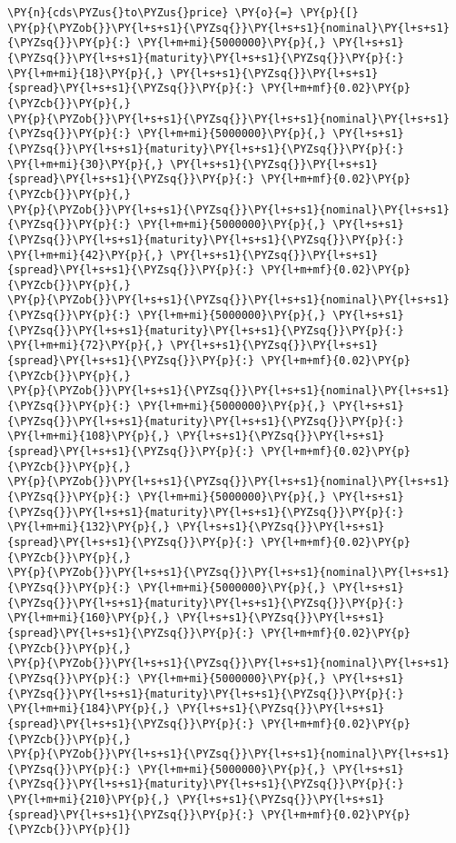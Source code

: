 \begin{Answer}
\begin{codebox}[size=fbox, boxrule=1pt,colback=cellbackground, colframe=cellborder]
\begin{Verbatim}[commandchars=\\\{\}]
\PY{n}{cds\PYZus{}to\PYZus{}price} \PY{o}{=} \PY{p}{[}
\PY{p}{\PYZob{}}\PY{l+s+s1}{\PYZsq{}}\PY{l+s+s1}{nominal}\PY{l+s+s1}{\PYZsq{}}\PY{p}{:} \PY{l+m+mi}{5000000}\PY{p}{,} \PY{l+s+s1}{\PYZsq{}}\PY{l+s+s1}{maturity}\PY{l+s+s1}{\PYZsq{}}\PY{p}{:} \PY{l+m+mi}{18}\PY{p}{,} \PY{l+s+s1}{\PYZsq{}}\PY{l+s+s1}{spread}\PY{l+s+s1}{\PYZsq{}}\PY{p}{:} \PY{l+m+mf}{0.02}\PY{p}{\PYZcb{}}\PY{p}{,}
\PY{p}{\PYZob{}}\PY{l+s+s1}{\PYZsq{}}\PY{l+s+s1}{nominal}\PY{l+s+s1}{\PYZsq{}}\PY{p}{:} \PY{l+m+mi}{5000000}\PY{p}{,} \PY{l+s+s1}{\PYZsq{}}\PY{l+s+s1}{maturity}\PY{l+s+s1}{\PYZsq{}}\PY{p}{:} \PY{l+m+mi}{30}\PY{p}{,} \PY{l+s+s1}{\PYZsq{}}\PY{l+s+s1}{spread}\PY{l+s+s1}{\PYZsq{}}\PY{p}{:} \PY{l+m+mf}{0.02}\PY{p}{\PYZcb{}}\PY{p}{,}
\PY{p}{\PYZob{}}\PY{l+s+s1}{\PYZsq{}}\PY{l+s+s1}{nominal}\PY{l+s+s1}{\PYZsq{}}\PY{p}{:} \PY{l+m+mi}{5000000}\PY{p}{,} \PY{l+s+s1}{\PYZsq{}}\PY{l+s+s1}{maturity}\PY{l+s+s1}{\PYZsq{}}\PY{p}{:} \PY{l+m+mi}{42}\PY{p}{,} \PY{l+s+s1}{\PYZsq{}}\PY{l+s+s1}{spread}\PY{l+s+s1}{\PYZsq{}}\PY{p}{:} \PY{l+m+mf}{0.02}\PY{p}{\PYZcb{}}\PY{p}{,}
\PY{p}{\PYZob{}}\PY{l+s+s1}{\PYZsq{}}\PY{l+s+s1}{nominal}\PY{l+s+s1}{\PYZsq{}}\PY{p}{:} \PY{l+m+mi}{5000000}\PY{p}{,} \PY{l+s+s1}{\PYZsq{}}\PY{l+s+s1}{maturity}\PY{l+s+s1}{\PYZsq{}}\PY{p}{:} \PY{l+m+mi}{72}\PY{p}{,} \PY{l+s+s1}{\PYZsq{}}\PY{l+s+s1}{spread}\PY{l+s+s1}{\PYZsq{}}\PY{p}{:} \PY{l+m+mf}{0.02}\PY{p}{\PYZcb{}}\PY{p}{,}
\PY{p}{\PYZob{}}\PY{l+s+s1}{\PYZsq{}}\PY{l+s+s1}{nominal}\PY{l+s+s1}{\PYZsq{}}\PY{p}{:} \PY{l+m+mi}{5000000}\PY{p}{,} \PY{l+s+s1}{\PYZsq{}}\PY{l+s+s1}{maturity}\PY{l+s+s1}{\PYZsq{}}\PY{p}{:} \PY{l+m+mi}{108}\PY{p}{,} \PY{l+s+s1}{\PYZsq{}}\PY{l+s+s1}{spread}\PY{l+s+s1}{\PYZsq{}}\PY{p}{:} \PY{l+m+mf}{0.02}\PY{p}{\PYZcb{}}\PY{p}{,}
\PY{p}{\PYZob{}}\PY{l+s+s1}{\PYZsq{}}\PY{l+s+s1}{nominal}\PY{l+s+s1}{\PYZsq{}}\PY{p}{:} \PY{l+m+mi}{5000000}\PY{p}{,} \PY{l+s+s1}{\PYZsq{}}\PY{l+s+s1}{maturity}\PY{l+s+s1}{\PYZsq{}}\PY{p}{:} \PY{l+m+mi}{132}\PY{p}{,} \PY{l+s+s1}{\PYZsq{}}\PY{l+s+s1}{spread}\PY{l+s+s1}{\PYZsq{}}\PY{p}{:} \PY{l+m+mf}{0.02}\PY{p}{\PYZcb{}}\PY{p}{,}
\PY{p}{\PYZob{}}\PY{l+s+s1}{\PYZsq{}}\PY{l+s+s1}{nominal}\PY{l+s+s1}{\PYZsq{}}\PY{p}{:} \PY{l+m+mi}{5000000}\PY{p}{,} \PY{l+s+s1}{\PYZsq{}}\PY{l+s+s1}{maturity}\PY{l+s+s1}{\PYZsq{}}\PY{p}{:} \PY{l+m+mi}{160}\PY{p}{,} \PY{l+s+s1}{\PYZsq{}}\PY{l+s+s1}{spread}\PY{l+s+s1}{\PYZsq{}}\PY{p}{:} \PY{l+m+mf}{0.02}\PY{p}{\PYZcb{}}\PY{p}{,}
\PY{p}{\PYZob{}}\PY{l+s+s1}{\PYZsq{}}\PY{l+s+s1}{nominal}\PY{l+s+s1}{\PYZsq{}}\PY{p}{:} \PY{l+m+mi}{5000000}\PY{p}{,} \PY{l+s+s1}{\PYZsq{}}\PY{l+s+s1}{maturity}\PY{l+s+s1}{\PYZsq{}}\PY{p}{:} \PY{l+m+mi}{184}\PY{p}{,} \PY{l+s+s1}{\PYZsq{}}\PY{l+s+s1}{spread}\PY{l+s+s1}{\PYZsq{}}\PY{p}{:} \PY{l+m+mf}{0.02}\PY{p}{\PYZcb{}}\PY{p}{,}
\PY{p}{\PYZob{}}\PY{l+s+s1}{\PYZsq{}}\PY{l+s+s1}{nominal}\PY{l+s+s1}{\PYZsq{}}\PY{p}{:} \PY{l+m+mi}{5000000}\PY{p}{,} \PY{l+s+s1}{\PYZsq{}}\PY{l+s+s1}{maturity}\PY{l+s+s1}{\PYZsq{}}\PY{p}{:} \PY{l+m+mi}{210}\PY{p}{,} \PY{l+s+s1}{\PYZsq{}}\PY{l+s+s1}{spread}\PY{l+s+s1}{\PYZsq{}}\PY{p}{:} \PY{l+m+mf}{0.02}\PY{p}{\PYZcb{}}\PY{p}{]}


\end{Verbatim}
\end{codebox}
\end{Answer}

